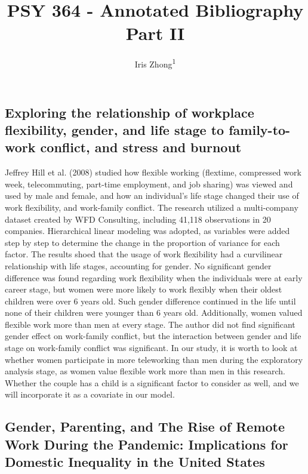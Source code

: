 \documentclass[
  english,
  man]{apa6}
\title{PSY 364 - Annotated Bibliography Part II}
\author{Iris Zhong\textsuperscript{1}}
\date{}
\affiliation{\vspace{0.5cm}\textsuperscript{1} Smith College}
\begin{document}
\maketitle

\hypertarget{exploring-the-relationship-of-workplace-flexibility-gender-and-life-stage-to-family-to-work-conflict-and-stress-and-burnout}{%
\subsection{Exploring the relationship of workplace flexibility, gender, and life stage to family-to-work conflict, and stress and burnout}\label{exploring-the-relationship-of-workplace-flexibility-gender-and-life-stage-to-family-to-work-conflict-and-stress-and-burnout}}

Jeffrey Hill et al. (2008) studied how flexible working (flextime, compressed work week, telecommuting, part-time employment, and job sharing) was viewed and used by male and female, and how an individual's life stage changed their use of work flexibility, and work-family conflict. The research utilized a multi-company dataset created by WFD Consulting, including 41,118 observations in 20 companies. Hierarchical linear modeling was adopted, as variables were added step by step to determine the change in the proportion of variance for each factor. The results shoed that the usage of work flexibility had a curvilinear relationship with life stages, accounting for gender. No significant gender difference was found regarding work flexibility when the individuals were at early career stage, but women were more likely to work flexibly when their oldest children were over 6 years old. Such gender difference continued in the life until none of their children were younger than 6 years old. Additionally, women valued flexible work more than men at every stage. The author did not find significant gender effect on work-family conflict, but the interaction between gender and life stage on work-family conflict was significant. In our study, it is worth to look at whether women participate in more teleworking than men during the exploratory analysis stage, as women value flexible work more than men in this research. Whether the couple has a child is a significant factor to consider as well, and we will incorporate it as a covariate in our model.

\hypertarget{gender-parenting-and-the-rise-of-remote-work-during-the-pandemic-implications-for-domestic-inequality-in-the-united-states}{%
\subsection{Gender, Parenting, and The Rise of Remote Work During the Pandemic: Implications for Domestic Inequality in the United States}\label{gender-parenting-and-the-rise-of-remote-work-during-the-pandemic-implications-for-domestic-inequality-in-the-united-states}}
\end{document}
